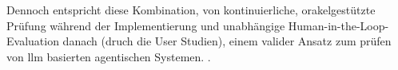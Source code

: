 Dennoch entspricht diese Kombination, von kontinuierliche, orakelgestützte Prüfung während der Implementierung und
unabhängige Human-in-the-Loop-Evaluation danach (druch die User Studien), einem valider Ansatz zum prüfen von
llm basierten agentischen Systemen.
\cite[pp.~6--7]{mohammadiEvaluationBenchmarkingLLM2025}.







